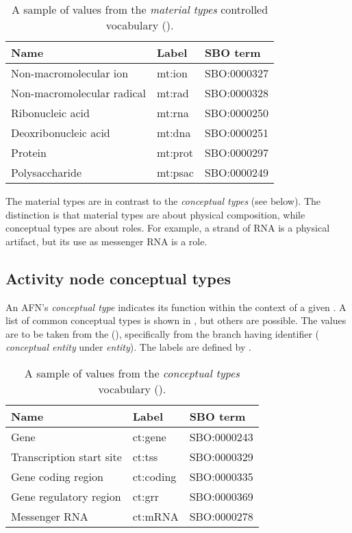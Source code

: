 \begin{table}[h]
  \centering
  \begin{tabular}{l>{\ttfamily}l>{\ttfamily}l}
    \toprule
    \textbf{Name}              & \textbf{\rmfamily Label} & \textbf{\rmfamily SBO term} \\
    \midrule
    Non-macromolecular ion     & mt:ion  & SBO:0000327\\
    Non-macromolecular radical & mt:rad  & SBO:0000328\\
    Ribonucleic acid           & mt:rna  & SBO:0000250\\
    Deoxribonucleic acid       & mt:dna  & SBO:0000251\\
    Protein                    & mt:prot & SBO:0000297\\
    Polysaccharide             & mt:psac & SBO:0000249\\
    \bottomrule
  \end{tabular}
  \caption{A sample of values from the \emph{material types} controlled
    vocabulary ().}
  \label{tab:af:material-types-cv}
\end{table}

The material types are in contrast to the \emph{conceptual types} (see below).  The distinction is that material types are about physical composition, while conceptual types are about roles.  For example, a strand of RNA is a physical artifact, but its use as messenger RNA is a role.

\subsection{Activity node conceptual types}
\label{sec:af:conceptual-types-cv}

An AFN's \emph{conceptual type} indicates its function within the context of a given \AF.  A list of common conceptual types is shown in , but others are possible.  The values are to be taken from the \sbo (\sbourl), specifically from the branch having identifier  ($\!$\emph{conceptual entity} under \emph{entity}).  The labels are defined by \SBGNAFLone.

\begin{table}[h]
  \centering
  \begin{tabular}{l>{\ttfamily}l>{\ttfamily}l}
    \toprule
    \textbf{Name}              & \textbf{\rmfamily Label} & \textbf{\rmfamily SBO term} \\
    \midrule
    Gene                      & ct:gene   & SBO:0000243\\
    Transcription start site  & ct:tss    & SBO:0000329\\
    Gene coding region        & ct:coding & SBO:0000335\\
    Gene regulatory region    & ct:grr    & SBO:0000369\\
    Messenger RNA             & ct:mRNA   & SBO:0000278\\
    \bottomrule
  \end{tabular}
  \caption{A sample of values from the \emph{conceptual types} vocabulary
    ().}
  \label{tab:af:conceptual-types-cv}
\end{table}

